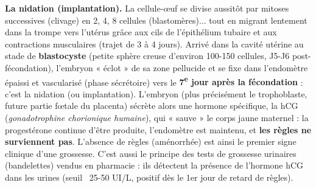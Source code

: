 \documentclass[11pt]{article}
\newcommand{\cle}[1]{{\popxbold\color{popdark}#1}}
\begin{document}
\textbf{La nidation (implantation).} La cellule-œuf se divise aussitôt par mitoses successives (clivage) en 2, 4, 8 cellules (blastomères)... tout en migrant lentement dans la trompe vers l'utérus grâce aux cils de l'épithélium tubaire et aux contractions musculaires (trajet de 3 à 4 jours). Arrivé dans la cavité utérine au stade de \textbf{blastocyste} (petite sphère creuse d'environ 100-150 cellules, J5-J6 post-fécondation), l'embryon « éclot » de sa zone pellucide et se fixe dans l'endomètre épaissi et vascularisé (phase sécrétoire) vers le \textbf{7\textsuperscript{e} jour après la fécondation} : c'est la \cle{nidation} (ou implantation). L'embryon (plus précisément le trophoblaste, future partie fœtale du placenta) sécrète alors une hormone spécifique, la \cle{hCG} (\emph{gonadotrophine chorionique humaine}), qui « sauve » le corps jaune maternel : la progestérone continue d'être produite, l'endomètre est maintenu, et \textbf{les règles ne surviennent pas}. L'absence de règles (aménorrhée) est ainsi le premier signe clinique d'une grossesse. C'est aussi le principe des tests de grossesse urinaires (bandelettes) vendus en pharmacie : ils détectent la présence de l'hormone hCG dans les urines (seuil ~25-50 UI/L, positif dès le 1er jour de retard de règles).
\end{document}

